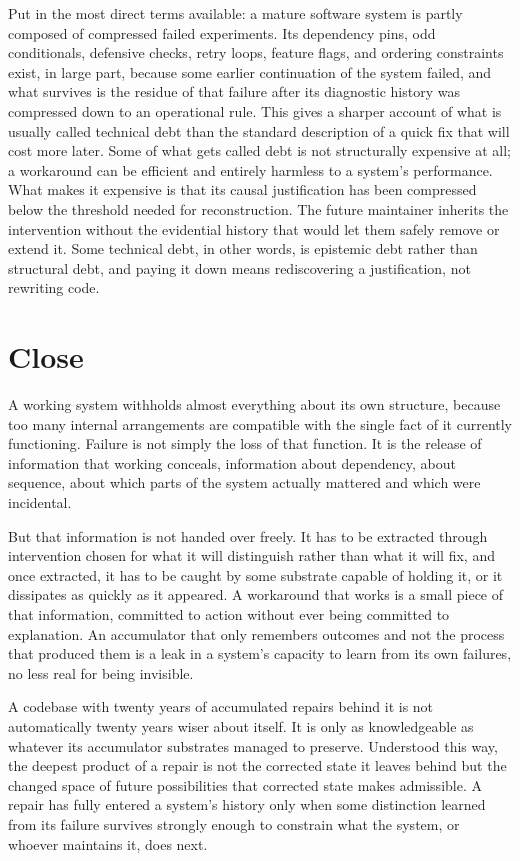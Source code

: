 \documentclass[11pt]{article}
\begin{document}
Put in the most direct terms available: a mature software system is partly composed of compressed failed experiments. Its dependency pins, odd conditionals, defensive checks, retry loops, feature flags, and ordering constraints exist, in large part, because some earlier continuation of the system failed, and what survives is the residue of that failure after its diagnostic history was compressed down to an operational rule. This gives a sharper account of what is usually called technical debt than the standard description of a quick fix that will cost more later. Some of what gets called debt is not structurally expensive at all; a workaround can be efficient and entirely harmless to a system's performance. What makes it expensive is that its causal justification has been compressed below the threshold needed for reconstruction. The future maintainer inherits the intervention without the evidential history that would let them safely remove or extend it. Some technical debt, in other words, is epistemic debt rather than structural debt, and paying it down means rediscovering a justification, not rewriting code.

\section{Close}

A working system withholds almost everything about its own structure, because too many internal arrangements are compatible with the single fact of it currently functioning. Failure is not simply the loss of that function. It is the release of information that working conceals, information about dependency, about sequence, about which parts of the system actually mattered and which were incidental.

But that information is not handed over freely. It has to be extracted through intervention chosen for what it will distinguish rather than what it will fix, and once extracted, it has to be caught by some substrate capable of holding it, or it dissipates as quickly as it appeared. A workaround that works is a small piece of that information, committed to action without ever being committed to explanation. An accumulator that only remembers outcomes and not the process that produced them is a leak in a system's capacity to learn from its own failures, no less real for being invisible.

A codebase with twenty years of accumulated repairs behind it is not automatically twenty years wiser about itself. It is only as knowledgeable as whatever its accumulator substrates managed to preserve. Understood this way, the deepest product of a repair is not the corrected state it leaves behind but the changed space of future possibilities that corrected state makes admissible. A repair has fully entered a system's history only when some distinction learned from its failure survives strongly enough to constrain what the system, or whoever maintains it, does next.
\end{document}
